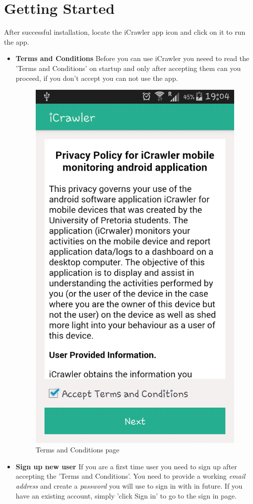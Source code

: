 \documentclass[hidelinks, 12pt, oneside]{article}
\begin{document}
	\section{Getting Started}
	After successful installation, locate the iCrawler app icon and click on it to run the app.
	 \begin{itemize}
	 	\item \textbf{Terms and Conditions}\newline
	 	Before you can use iCrawler you neeed to read the 'Terms and Conditions' on startup and only 
	 	after accepting them can you proceed, if you don't accept you can not use the app.
	 	 
	 	 \begin{figure}[h!]
	 	 	\caption{Terms and Conditions page}
	 	 	\centering 																												\includegraphics[width=0.5 \textwidth]{img/tnc2.png}
	 	 \end{figure}\newpage
	 	 
	 	\item \textbf{Sign up new user}\newline
	 	If you are a first time user you need to sign up after accepting the 'Terms and Conditions'. You need
	 	to provide a working \emph{email address} and create a \emph{password} you will use to sign in with in future.
	 	If you have an existing account, simply 'click Sign in' to go to the sign in page.
	 	 

\end{itemize}
\end{document}
